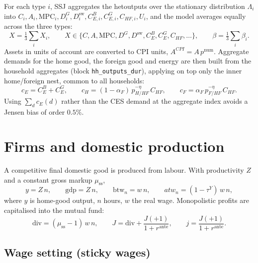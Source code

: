 \documentclass[11pt]{article}
\newcommand{\num}{\mathrm{num}}
\newcommand{\stst}{\mathrm{ss}}
\newcommand{\dsw}{D^{\mathrm{sw}}}
\newcommand{\DG}{D^{G}}
\begin{document}
For each type $i$, SSJ aggregates the hetoutputs over the stationary
distribution $\Lambda_i$ into $C_i,A_i,\mathrm{MPC}_i,\DG_i,\dsw_i,
C^{B}_{E,i},C^{G}_{E,i},C_{HF,i},U_i$, and the model averages equally across the
three types:
\begin{equation}
X=\tfrac13\textstyle\sum_i X_i,\qquad
X\in\{C,A,\mathrm{MPC},\DG,\dsw,C^{B}_{E},C^{G}_{E},C_{HF},\ldots\},
\qquad \beta=\tfrac13\textstyle\sum_i\beta_i .
\end{equation}
Assets in units of account are converted to CPI units, $A^{CPI}=A\,p^{\num}$.
Aggregate demands for the home good, the foreign good and energy are then built
from the household aggregates (block \texttt{hh\_outputs\_dur}), applying on top
only the inner home/foreign nest, common to all households:
\begin{equation}
c_E = C^{B}_{E}+C^{G}_{E},\qquad
c_H = (1-\alpha_F)\,p_{H/HF}^{-\eta}\,C_{HF},\qquad
c_F = \alpha_F\,p_{F/HF}^{-\eta}\,C_{HF}. \label{eq:cHcF}
\end{equation}
Using $\sum_d c_E(d)$ rather than the CES demand at the aggregate index avoids a
Jensen bias of order $0.5\%$.

\section{Firms and domestic production}\label{sec:firms}

A competitive final domestic good is produced from labour. With productivity $Z$
and a constant gross markup $\mu_{\stst}$,
\begin{equation}
y = Z\,n,\qquad
\mathrm{gdp}=Z\,n,\qquad
\text{btw}_n = w\,n,\qquad
atw_n = (1-\tau^{Y})\,w\,n,
\end{equation}
where $y$ is home-good output, $n$ hours, $w$ the real wage. Monopolistic
profits are capitalised into the mutual fund:
\begin{equation}
\mathrm{div}=(\mu_{\stst}-1)\,w\,n,\qquad
J=\mathrm{div}+\frac{J(+1)}{1+r^{\text{ante}}},\qquad
j=\frac{J(+1)}{1+r^{\text{ante}}}.
\end{equation}

\subsection{Wage setting (sticky wages)}\label{sec:union}
\end{document}
